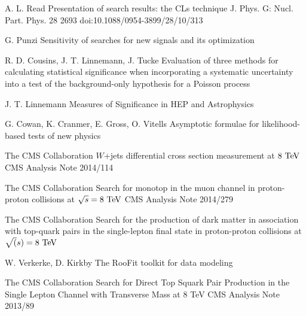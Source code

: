 \begin{thebibliography}{2}

             {A. L. Read}
             {Presentation of search results: the CLs technique}
             {J. Phys. G: Nucl. Part. Phys. 28 2693 doi:10.1088/0954-3899/28/10/313}

             {G. Punzi}
             {Sensitivity of searches for new signals and its optimization}
             {}

             {R. D. Cousins, J. T. Linnemann, J. Tucke}
             {Evaluation of three methods for calculating
             statistical significance when incorporating a
             systematic uncertainty into a test of the
             background-only hypothesis for a Poisson
             process}
             {}

             {J. T. Linnemann}
             {Measures of Significance in HEP and Astrophysics}
             {}

             {G. Cowan, K. Cranmer, E. Gross, O. Vitells}
             {Asymptotic formulae for likelihood-based tests of new physics}
             {}


             {The CMS Collaboration}
             {$W$+jets differential cross section measurement at $8~\text{TeV}$}
             {CMS Analysis Note 2014/114}

             {The CMS Collaboration}
             {Search for monotop in the muon channel in proton-proton collisions at $\sqrt{s} = 8~\text{TeV}$}
             {CMS Analysis Note 2014/279}

             {The CMS Collaboration}
             {Search for the production of dark matter in association with top-quark pairs
             in the single-lepton final state in proton-proton collisions at $\sqrt(s) = 8~\text{TeV}$}
             {}

             {W. Verkerke, D. Kirkby}
             {The RooFit toolkit for data modeling}
             {}


             {The CMS Collaboration}
             {Search for Direct Top Squark Pair Production in the Single Lepton Channel
             with Transverse Mass at 8 TeV}
             {CMS Analysis Note 2013/89}


\end{thebibliography}
